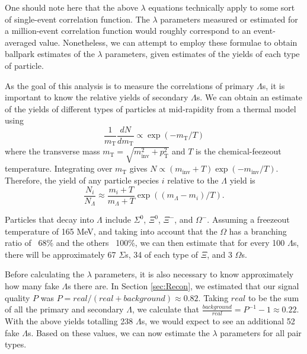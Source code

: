 One should note here that the above $\lambda$ equations technically apply to some sort of single-event correlation function.  The $\lambda$ parameters measured or estimated for a million-event correlation function would roughly correspond to an event-averaged value.  Nonetheless, we can attempt to employ these formulae to obtain ballpark estimates of the $\lambda$ parameters, given estimates of the yields of each type of particle.

As the goal of this analysis is to measure the correlations of primary $\Lambda$s, it is important to know the relative yields of secondary $\Lambda$s.  We can obtain an estimate \cite{Florkowski:2010zz} of the yields of different types of particles at mid-rapidity from a thermal model using
\begin{equation}
\frac{1}{m_{\mathrm{T}}}\frac{dN}{dm_{\mathrm{T}}} \propto \exp{(-m_\mathrm{T}/T)}
\end{equation}
where the transverse mass $m_\mathrm{T} = \sqrt{m^2_{\mathrm{inv}} + p^2_{\mathrm{T}}}$ and $T$ is the chemical-feezeout temperature.  Integrating over $m_\mathrm{T}$ gives $N \propto (m_\mathrm{inv} + T) \exp{(-m_\mathrm{inv}/T)}$.  Therefore, the yield of any particle species $i$ relative to the $\Lambda$ yield is
\begin{equation}
\frac{N_i}{N_\Lambda} \approx \frac{m_i + T}{m_\Lambda + T} \exp{((m_\Lambda - m_i)/T)}.
\end{equation}

Particles that decay into $\Lambda$ include $\Sigma^0$, $\Xi^0$, $\Xi^-$, and $\Omega^-$.  Assuming a freezeout temperature of 165 MeV, and taking into account that the $\Omega$ has a branching ratio of ~68\% and the others ~100\%, we can then estimate that for every 100 $\Lambda$s, there will be approximately 67 $\Sigma$s, 34 of each type of $\Xi$, and 3 $\Omega$s.

Before calculating the $\lambda$ parameters, it is also necessary to know approximately how many fake $\Lambda$s there are.  In Section \ref{sec:Recon}, we estimated that our signal quality $P$ was $P = real/(real + background) \approx 0.82$.  Taking $real$ to be the sum of all the primary and secondary $\Lambda$, we calculate that $\frac{background}{real} = P^{-1}-1 \approx 0.22$.  With the above yields totalling 238 $\Lambda$s, we would expect to see an additional 52 fake $\Lambda$s.  Based on these values, we can now estimate the $\lambda$ parameters for all pair types.

